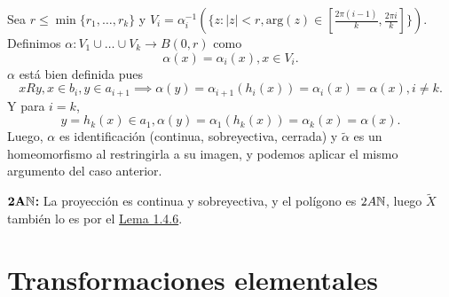 {\begin{enumerate}
        Sea $r \le \min\{r_1, \dots, r_k\}$ y $V_i = \alpha_i^{-1}(\{z : |z| < r, \text{arg}(z) \in [\frac{2\pi(i-1)}{k}, \frac{2\pi i}{k}]\})$. Definimos $\alpha : V_1 \cup \dots \cup V_k \to B(0,r)$ como
        \[
        \alpha(x) = \alpha_i(x), x \in V_i.
        \]
        $\alpha$ está bien definida pues
        \[
        xRy, x\in b_i, y \in a_{i+1} \implies \alpha(y) = \alpha_{i+1}(h_i(x)) = \alpha_i(x) = \alpha(x), i\ne k.
        \]
        Y para $i=k$,
        \[
        y = h_k(x) \in a_1, \alpha(y)=\alpha_{1}(h_k(x))=\alpha_k(x)=\alpha(x).
        \]
        Luego, $\alpha$ es identificación (continua, sobreyectiva, cerrada) y $\tilde{\alpha}$ es un homeomorfismo al restringirla a su imagen, y podemos aplicar el mismo argumento del caso anterior.
    \end{enumerate}

    \textbf{$\mathbf{2A\mathbb{N}}$:} La proyección es continua y sobreyectiva, y el polígono es $2A\mathbb{N}$, luego $\tilde{X}$ también lo es por el \hyperref[lem:146]{Lema 1.4.6}.
}


\clearpage

\section{Transformaciones elementales}

